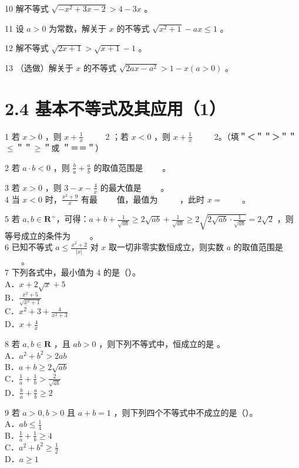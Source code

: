 \documentclass[10pt]{article}
\begin{document}
10 解不等式 \(\sqrt{-x^{2}+3 x-2}>4-3 x\) 。

11 设 \(a>0\) 为常数，解关于 \(x\) 的不等式 \(\sqrt{x^{2}+1}-a x \leqslant 1\) 。

12 解不等式 \(\sqrt{2 x+1}>\sqrt{x+1}-1\) 。

13 （选做）解关于 \(x\) 的不等式 \(\sqrt{2 a x-a^{2}}>1-x(a>0)\) 。

\section*{2.4 基本不等式及其应用（1）}
1 若 \(x>0\) ，则 \(x+\frac{1}{x}\) \(\qquad\) 2 ；若 \(x<0\) ，则 \(x+\frac{1}{x}\) \(\qquad\) 2。（填＂＜＂＂＞＂＂\(\leqslant\)＂＂\(\geqslant\)＂或 ＂＝＝＂）

2 若 \(a \cdot b<0\) ，则 \(\frac{b}{a}+\frac{a}{b}\) 的取值范围是 \(\qquad\)。

3 若 \(x>0\) ，则 \(3-x-\frac{4}{x}\) 的最大值是 \(\qquad\)。\\
4 当 \(x<0\) 时，\(\frac{x^{2}+9}{x}\) 有最 \(\qquad\)值，最值为 \(\qquad\) ，此时 \(x=\) \(\qquad\)。

5 若 \(a, b \in \mathbf{R}^{+}\)，可得：\(a+b+\frac{1}{\sqrt{a b}} \geqslant 2 \sqrt{a b}+\frac{1}{\sqrt{a b}} \geqslant 2 \sqrt{2 \sqrt{a b} \cdot \frac{1}{\sqrt{a b}}}=2 \sqrt{2}\) ，则等号成立的条件为 \(\qquad\)。\\
6 已知不等式 \(a \leqslant \frac{x^{2}+2}{|x|}\) 对 \(x\) 取一切非零实数恒成立，则实数 \(a\) 的取值范围是 \(\qquad\)。\\
7 下列各式中，最小值为 4 的是（）。\\
A．\(x+2 \sqrt{x}+5\)\\
B．\(\frac{x^{2}+5}{\sqrt{x^{2}+1}}\)\\
C．\(x^{2}+3+\frac{4}{x^{2}+3}\)\\
D．\(x+\frac{4}{x}\)

8 若 \(a, b \in \mathbf{R}\) ，且 \(a b>0\) ，则下列不等式中，恒成立的是 。\\
A．\(a^{2}+b^{2}>2 a b\)\\
B．\(a+b \geqslant 2 \sqrt{a b}\)\\
C．\(\frac{1}{a}+\frac{1}{b}>\frac{2}{\sqrt{a b}}\)\\
D．\(\frac{b}{a}+\frac{a}{b} \geqslant 2\)

9 若 \(a>0, b>0\) 且 \(a+b=1\) ，则下列四个不等式中不成立的是（）。\\
A．\(a b \leqslant \frac{1}{4}\)\\
B．\(\frac{1}{a}+\frac{1}{b} \geqslant 4\)\\
C．\(a^{2}+b^{2} \geqslant \frac{1}{2}\)\\
D．\(a \geqslant 1\)
\end{document}
